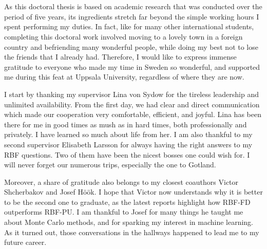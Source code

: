 \documentclass{UUThesisTemplate}
\begin{document}






\chapter{{}}
{\noteunic
\par
As this doctoral thesis is based on academic research that was conducted over the period of five years, its ingredients stretch far beyond the simple working hours I spent performing my duties. In fact, like for many other international students, completing this doctoral work involved moving to a lovely town in a foreign country and befriending many wonderful people, while doing my best not to lose the friends that I already had. Therefore, I would like to express immense gratitude to everyone who made my time in Sweden so wonderful, and supported me during this feat at Uppsala University, regardless of where they are now.

\par
I start by thanking my supervisor Lina von Sydow for the tireless leadership and unlimited availability. From the first day, we had clear and direct communication which made our cooperation very comfortable, efficient, and joyful. Lina has been there for me in good times as mush as in hard times, both professionally and privately. I have learned so much about life from her. I am also thankful to my second supervisor Elisabeth Larsson for always having the right answers to my RBF questions. Two of them have been the nicest bosses one could wish for. I will never forget our numerous trips, especially the one to Gotland.

\par
Moreover, a share of gratitude also belongs to my closest coauthors Victor Shcherbakov and Josef Höök. I hope that Victor now understands why it is better to be the second one to graduate, as the latest reports highlight how RBF-FD outperforms RBF-PU. I am thankful to Josef for many things he taught me about Monte Carlo methods, and for sparking my interest in machine learning. As it turned out, those conversations in the hallways happened to lead me to my future career. 

}
\end{document}
